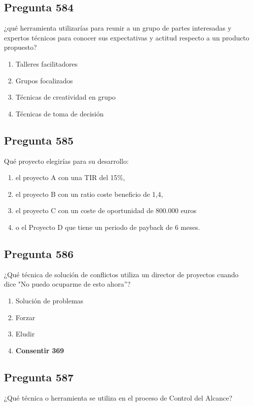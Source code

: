 \documentclass[11pt,a4paper]{article}
\begin{document}
\subsection*{Pregunta 584}
¿qué herramienta utilizarías para reunir a un grupo de partes interesadas y expertos técnicos para conocer sus expectativas y actitud respecto a un producto propuesto?

\begin{enumerate}[label=\alph*)]
  \item Talleres facilitadores
  \item Grupos focalizados
  \item Técnicas de creatividad en grupo
  \item Técnicas de toma de decisión
\end{enumerate}

\subsection*{Pregunta 585}
Qué proyecto elegirías para su desarrollo:

\begin{enumerate}[label=\alph*)]
  \item el proyecto A con una TIR del 15\%,
  \item el proyecto B con un ratio coste beneficio de 1,4,
  \item el proyecto C con un coste de oportunidad de 800.000 euros
  \item o el Proyecto D que tiene un periodo de payback de 6 meses.
\end{enumerate}

\subsection*{Pregunta 586}
¿Qué técnica de solución de conflictos utiliza un director de proyectos cuando dice "No puedo ocuparme de esto ahora''?

\begin{enumerate}[label=\alph*)]
  \item Solución de problemas
  \item Forzar
  \item Eludir
  \item \textbf{Consentir 369}
\end{enumerate}

\subsection*{Pregunta 587}
¿Qué técnica o herramienta se utiliza en el proceso de Control del Alcance?
\end{document}
